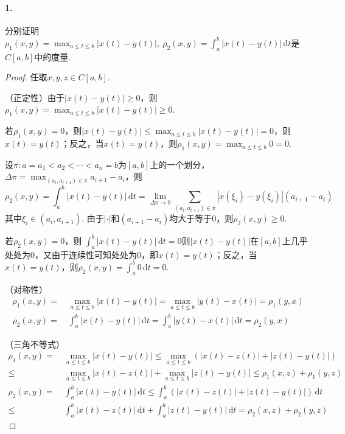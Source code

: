 \documentclass[12pt, a4paper, oneside]{ctexart}
\let\leq=\leqslant %
\let\geq=\geqslant %
\def\d{\mathrm{d}}          %
\def\del{\vspace{-1.5ex}}   %
\begin{document}
\paragraph*{1.}分别证明$\rho_1(x, y) = \max_{a\leq t\leq b}|x(t) - y(t)|,\ \rho_2(x, y)=\int_a^b|x(t)-y(t)|\,\d t$是$C[a, b]$中的度量.
\begin{proof}
    任取$x, y, z\in C[a, b]$.

    （正定性）由于$|x(t) - y(t)|\geq 0$，则$\rho_1(x, y) = \max_{a\leq t\leq b}|x(t)-y(t)|\geq 0$.
    
    若$\rho_1(x, y) = 0$，则$|x(t)-y(t)|\leq \max_{a\leq t\leq b}|x(t)-y(t)| = 0$，则$x(t) = y(t)$；反之，当$x(t)=y(t)$，则$\rho_1(x, y) = \max_{a\leq t\leq b}0 = 0$.
    
    设$\pi:a=a_1<a_2<\cdots<a_n=b$为$[a,b]$上的一个划分，$\Delta\pi = \max_{(a_i, a_{i+1})\in \pi}a_{i+1}-a_i$，则
    \begin{equation*}
        \rho_2(x,y)=\int_a^b|x(t)-y(t)|\,\d t = \lim_{\Delta\pi\to0}\sum_{(a_i,a_{i+1})\in\pi}|x(\xi_i)-y(\xi_i)|(a_{i+1}-a_i)
    \end{equation*}
    其中$\xi_i\in(a_i,a_{i+1})$. 由于$|\cdot|$和$(a_{i+1}-a_i)$均大于等于$0$，则$\rho_2(x,y)\geq 0$.
    
    若$\rho_2(x, y)=  0$，则 $\int_a^b|x(t)- y(t)|\,\d t = 0$则$|x(t)-y(t)|$在$[a,b]$上几乎处处为$0$，又由于连续性可知处处为$0$，即$x(t)=y(t)$；反之，当$x(t) = y(t)$，则$\rho_2(x, y) = \int_a^b0\,\d t = 0$.

    （对称性）\del
    \begin{align*}
        \rho_1(x, y) =&\ \max_{a\leq t\leq b}|x(t)-y(t)| = \max_{a\leq t\leq b}|y(t)-x(t)| = \rho_1(y, x)\\
        \rho_2(x, y) =&\ \int_a^b|x(t)-y(t)|\,\d t = \int_a^b|y(t)-x(t)|\,\d t=\rho_2(y,x)
    \end{align*}

    （三角不等式）\del
    \begin{align*}
        \rho_1(x, y)=&\ \max_{a\leq t\leq b}|x(t)-y(t)|\leq\max_{a\leq t\leq b}(|x(t)-z(t)|+|z(t)-y(t)|) \\
        \leq&\ \max_{a\leq t\leq b}|x(t)-z(t)|+\max_{a\leq t\leq b}|z(t)-y(t)| \leq \rho_1(x, z)+\rho_1(y, z)\\
        \rho_2(x, y) =&\ \int_a^b|x(t)-y(t)|\,\d t\leq \int_a^b(|x(t)-z(t)|+|z(t)-y(t)|)\,\d t\\
        \leq&\ \int_a^b|x(t)-z(t)|\,\d t+\int_a^b|z(t)-y(t)|\,\d t = \rho_2(x, z) + \rho_2(y, z)
    \end{align*}
\end{proof}
\end{document}
